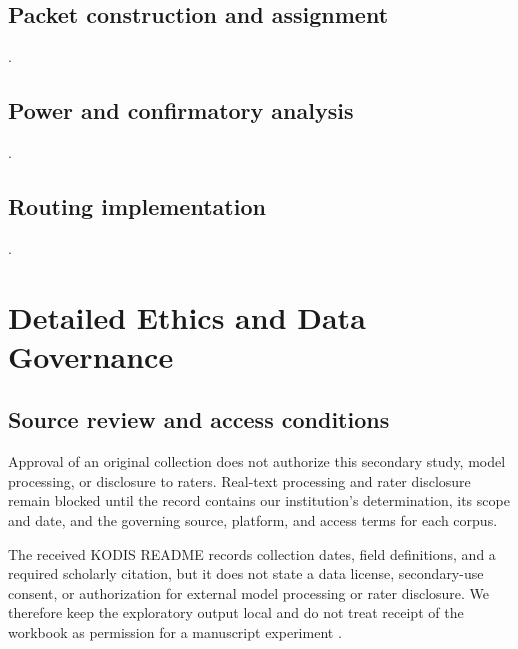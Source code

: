 \subsection{Packet construction and assignment}
.

\subsection{Power and confirmatory analysis}
.

\subsection{Routing implementation}
.

\section{Detailed Ethics and Data Governance}
\label{sec:detailed_ethics}

\subsection{Source review and access conditions}

Approval of an original collection does not authorize this secondary study, model processing, or disclosure to raters. Real-text processing and rater disclosure remain blocked until the record contains our institution's determination, its scope and date, and the governing source, platform, and access terms for each corpus.

The received KODIS README records collection dates, field definitions, and a
required scholarly citation, but it does not state a data license, secondary-use
consent, or authorization for external model processing or rater disclosure.
We therefore keep the exploratory output local and do not treat receipt of the
workbook as permission for a manuscript experiment \citep{hale2025kodis}.

